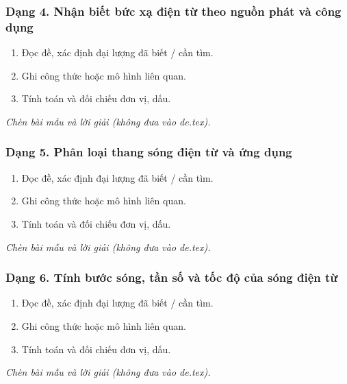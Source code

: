 \subsubsection{Dạng 4. Nhận biết bức xạ điện từ theo nguồn phát và công dụng}
\begin{phuongphap}
\begin{enumerate}
\item Đọc đề, xác định đại lượng đã biết / cần tìm.
\item Ghi công thức hoặc mô hình liên quan.
\item Tính toán và đối chiếu đơn vị, dấu.
\end{enumerate}
\end{phuongphap}
\begin{vidumau}
\textit{Chèn bài mẫu và lời giải (không đưa vào de.tex).}
\end{vidumau}

\subsubsection{Dạng 5. Phân loại thang sóng điện từ và ứng dụng}
\begin{phuongphap}
\begin{enumerate}
\item Đọc đề, xác định đại lượng đã biết / cần tìm.
\item Ghi công thức hoặc mô hình liên quan.
\item Tính toán và đối chiếu đơn vị, dấu.
\end{enumerate}
\end{phuongphap}
\begin{vidumau}
\textit{Chèn bài mẫu và lời giải (không đưa vào de.tex).}
\end{vidumau}

\subsubsection{Dạng 6. Tính bước sóng, tần số và tốc độ của sóng điện từ}
\begin{phuongphap}
\begin{enumerate}
\item Đọc đề, xác định đại lượng đã biết / cần tìm.
\item Ghi công thức hoặc mô hình liên quan.
\item Tính toán và đối chiếu đơn vị, dấu.
\end{enumerate}
\end{phuongphap}
\begin{vidumau}
\textit{Chèn bài mẫu và lời giải (không đưa vào de.tex).}
\end{vidumau}

